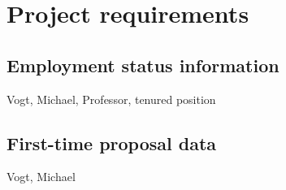 \documentclass[a4paper,12pt]{article}
\begin{document}








\section{Project requirements}

\subsection{Employment status information}

Vogt, Michael, Professor, tenured position

\subsection{First-time proposal data}

Vogt, Michael
\end{document}

